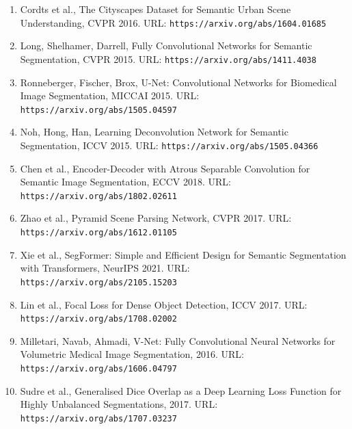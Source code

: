 \documentclass[12pt,a4paper]{article}
\begin{document}
\begin{enumerate}
  \item Cordts et al., The Cityscapes Dataset for Semantic Urban Scene Understanding, CVPR 2016. URL: \texttt{https://arxiv.org/abs/1604.01685}
  \item Long, Shelhamer, Darrell, Fully Convolutional Networks for Semantic Segmentation, CVPR 2015. URL: \texttt{https://arxiv.org/abs/1411.4038}
  \item Ronneberger, Fischer, Brox, U-Net: Convolutional Networks for Biomedical Image Segmentation, MICCAI 2015. URL: \texttt{https://arxiv.org/abs/1505.04597}
  \item Noh, Hong, Han, Learning Deconvolution Network for Semantic Segmentation, ICCV 2015. URL: \texttt{https://arxiv.org/abs/1505.04366}
  \item Chen et al., Encoder-Decoder with Atrous Separable Convolution for Semantic Image Segmentation, ECCV 2018. URL: \texttt{https://arxiv.org/abs/1802.02611}
  \item Zhao et al., Pyramid Scene Parsing Network, CVPR 2017. URL: \texttt{https://arxiv.org/abs/1612.01105}
  \item Xie et al., SegFormer: Simple and Efficient Design for Semantic Segmentation with Transformers, NeurIPS 2021. URL: \texttt{https://arxiv.org/abs/2105.15203}
  \item Lin et al., Focal Loss for Dense Object Detection, ICCV 2017. URL: \texttt{https://arxiv.org/abs/1708.02002}
  \item Milletari, Navab, Ahmadi, V-Net: Fully Convolutional Neural Networks for Volumetric Medical Image Segmentation, 2016. URL: \texttt{https://arxiv.org/abs/1606.04797}
  \item Sudre et al., Generalised Dice Overlap as a Deep Learning Loss Function for Highly Unbalanced Segmentations, 2017. URL: \texttt{https://arxiv.org/abs/1707.03237}
\end{enumerate}
\end{document}
